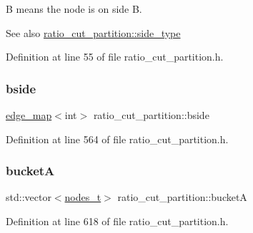 {\ttfamily B} means the node is on side B.

\begin{DoxySeeAlso}{See also}
\mbox{\hyperlink{classratio__cut__partition_ace53442bd0c1e21fbf00858ec6f6b456}{ratio\+\_\+cut\+\_\+partition\+::side\+\_\+type}} 
\end{DoxySeeAlso}


Definition at line 55 of file ratio\+\_\+cut\+\_\+partition.\+h.

\mbox{\label{classratio__cut__partition_ab9c1166efb1cbb65ff6c55bb6e3c9e6d}} 
\subsubsection{\texorpdfstring{bside}{bside}}
{\footnotesize\ttfamily \mbox{\hyperlink{classedge__map}{edge\+\_\+map}}$<$int$>$ ratio\+\_\+cut\+\_\+partition\+::bside\hspace{0.3cm}{\ttfamily [protected]}}



Definition at line 564 of file ratio\+\_\+cut\+\_\+partition.\+h.

\mbox{\label{classratio__cut__partition_ac9c2f4f99e1042d69f44c1a1f79d4a2f}} 
\subsubsection{\texorpdfstring{bucketA}{bucketA}}
{\footnotesize\ttfamily std\+::vector$<$\mbox{\hyperlink{edge_8h_a22ac17689106ba21a84e7bc54d1199d6}{nodes\+\_\+t}}$>$ ratio\+\_\+cut\+\_\+partition\+::bucketA\hspace{0.3cm}{\ttfamily [protected]}}



Definition at line 618 of file ratio\+\_\+cut\+\_\+partition.\+h.

\mbox{\label{classratio__cut__partition_a2e3f25066f798f28e9e5646f866ffc1c}} 
